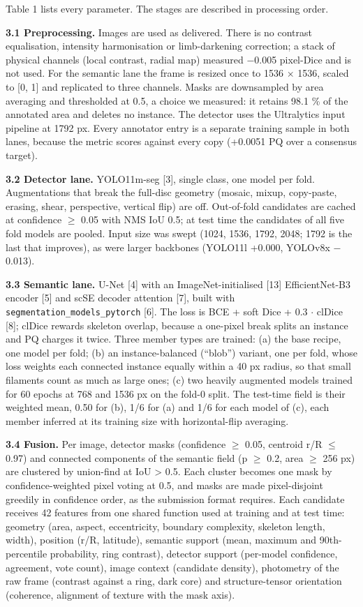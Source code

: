 Table 1 lists every parameter. The stages are described in processing order.

\textbf{3.1 Preprocessing.} Images are used as delivered. There is no contrast equalisation, intensity
harmonisation or limb-darkening correction; a stack of physical channels (local contrast, radial
map) measured $-$0.005 pixel-Dice and is not used. For the semantic lane the frame is resized once
to 1536 $\times$ 1536, scaled to {[}0, 1{]} and replicated to three channels. Masks are downsampled by area
averaging and thresholded at 0.5, a choice we measured: it retains 98.1 \% of the annotated area
and deletes no instance. The detector uses the Ultralytics input pipeline at 1792 px. Every
annotator entry is a separate training sample in both lanes, because the metric scores against
every copy (+0.0051 PQ over a consensus target).

\textbf{3.2 Detector lane.} YOLO11m-seg {[}3{]}, single class, one model per fold. Augmentations that break
the full-disc geometry (mosaic, mixup, copy-paste, erasing, shear, perspective, vertical flip) are
off. Out-of-fold candidates are cached at confidence $\geq$ 0.05 with NMS IoU 0.5; at test time the
candidates of all five fold models are pooled. Input size was swept (1024, 1536, 1792, 2048; 1792
is the last that improves), as were larger backbones (YOLO11l +0.000, YOLOv8x $-$0.013).

\textbf{3.3 Semantic lane.} U-Net {[}4{]} with an ImageNet-initialised {[}13{]} EfficientNet-B3 encoder {[}5{]}
and scSE decoder attention {[}7{]}, built with \texttt{segmentation\_models\_pytorch} {[}6{]}. The loss is
BCE + soft Dice + 0.3 $\cdot$ clDice {[}8{]}; clDice rewards skeleton overlap, because a one-pixel break
splits an instance and PQ charges it twice. Three member types are trained: (a) the base recipe,
one model per fold; (b) an instance-balanced (``blob'') variant, one per fold, whose loss weights
each connected instance equally within a 40 px radius, so that small filaments count as much as
large ones; (c) two heavily augmented models trained for 60 epochs at 768 and 1536 px on the fold-0 split. The
test-time field is their weighted mean, 0.50 for (b), 1/6 for (a) and 1/6 for each model of (c),
each member inferred at its training size with horizontal-flip averaging.

\textbf{3.4 Fusion.} Per image, detector masks (confidence $\geq$ 0.05, centroid r/R $\leq$ 0.97) and connected
components of the semantic field (p $\geq$ 0.2, area $\geq$ 256 px) are clustered by union-find at
IoU \textgreater{} 0.5. Each cluster becomes one mask by confidence-weighted pixel voting at 0.5, and masks are
made pixel-disjoint greedily in confidence order, as the submission format requires. Each
candidate receives 42 features from one shared function used at training and at test time:
geometry (area, aspect, eccentricity, boundary complexity, skeleton length, width), position
(r/R, latitude), semantic support (mean, maximum and 90th-percentile probability, ring contrast),
detector support (per-model confidence, agreement, vote count), image context (candidate density),
photometry of the raw frame (contrast against a ring, dark core) and structure-tensor orientation
(coherence, alignment of texture with the mask axis).


